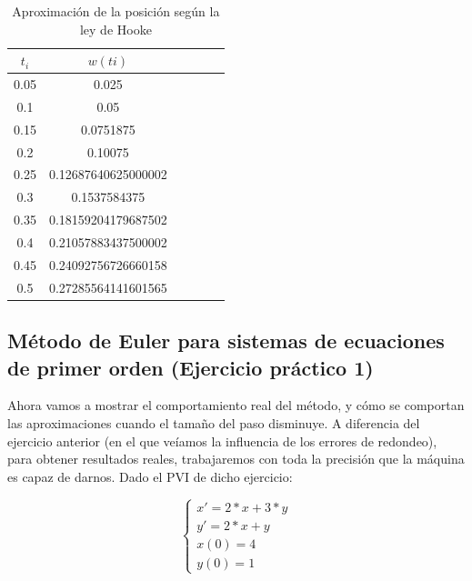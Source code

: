 \documentclass[12pt]{article}       %
\begin{document}
    \begin{table}[H]
        \centering
        \setlength\extrarowheight{2.5pt}
        
        \begin{tabular}{|c|c|c|c|c|c}
            \hline
            \textbf{$t_i$} & {\textbf{$w(ti)$}}\\ 
            \hline
                0.05  &    0.025 \\
                \hline
                 0.1   &   0.05 \\
                 \hline
                0.15  &    0.0751875 \\
                \hline
                 0.2  &    0.10075 \\
                 \hline
                0.25  &    0.12687640625000002 \\
                \hline
                 0.3   &   0.1537584375 \\
                 \hline
                0.35  &    0.18159204179687502 \\
                \hline
             0.4   &   0.21057883437500002 \\
             \hline
             0.45  &    0.24092756726660158 \\
             \hline
             0.5   &   0.27285564141601565 \\
             \hline
        \end{tabular}
        
        \caption{Aproximación de la posición según la ley de Hooke}           
    \end{table}

\subsection{Método de Euler para sistemas de ecuaciones de primer orden (Ejercicio práctico 1)}

Ahora vamos a mostrar el comportamiento real del método, y cómo se comportan las aproximaciones cuando el tamaño del paso disminuye. A diferencia del ejercicio anterior (en el que veíamos la influencia de los errores de redondeo), para obtener resultados reales, trabajaremos con toda la precisión que la máquina es capaz de darnos. Dado el PVI de dicho ejercicio:

$$
\begin{cases}
x' = 2*x + 3 * y\\
y' = 2*x + y \\
x(0) = 4\\
y(0)=1
\end{cases}
$$
\end{document}
